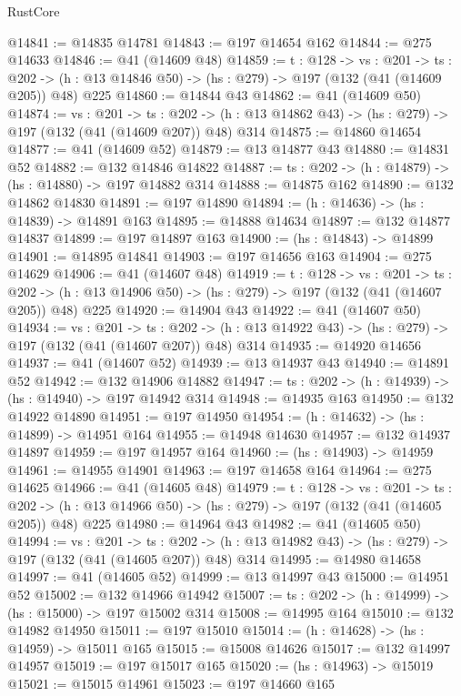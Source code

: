\begin{lexlean}{RustCore}
\begin{coremodule}
@14841 := @14835 @14781
@14843 := @197 @14654 @162
@14844 := @275 @14633
@14846 := @41 (@14609 @48)
@14859 := {t : @128} ->
  {vs : @201} ->
  {ts : @202} -> (h : @13 @14846 @50) -> (hs : @279) -> @197 (@132 (@41 (@14609 @205)) @48) @225
@14860 := @14844 @43
@14862 := @41 (@14609 @50)
@14874 := {vs : @201} ->
  {ts : @202} -> (h : @13 @14862 @43) -> (hs : @279) -> @197 (@132 (@41 (@14609 @207)) @48) @314
@14875 := @14860 @14654
@14877 := @41 (@14609 @52)
@14879 := @13 @14877 @43
@14880 := @14831 @52
@14882 := @132 @14846 @14822
@14887 := {ts : @202} -> (h : @14879) -> (hs : @14880) -> @197 @14882 @314
@14888 := @14875 @162
@14890 := @132 @14862 @14830
@14891 := @197 @14890
@14894 := (h : @14636) -> (hs : @14839) -> @14891 @163
@14895 := @14888 @14634
@14897 := @132 @14877 @14837
@14899 := @197 @14897 @163
@14900 := (hs : @14843) -> @14899
@14901 := @14895 @14841
@14903 := @197 @14656 @163
@14904 := @275 @14629
@14906 := @41 (@14607 @48)
@14919 := {t : @128} ->
  {vs : @201} ->
  {ts : @202} -> (h : @13 @14906 @50) -> (hs : @279) -> @197 (@132 (@41 (@14607 @205)) @48) @225
@14920 := @14904 @43
@14922 := @41 (@14607 @50)
@14934 := {vs : @201} ->
  {ts : @202} -> (h : @13 @14922 @43) -> (hs : @279) -> @197 (@132 (@41 (@14607 @207)) @48) @314
@14935 := @14920 @14656
@14937 := @41 (@14607 @52)
@14939 := @13 @14937 @43
@14940 := @14891 @52
@14942 := @132 @14906 @14882
@14947 := {ts : @202} -> (h : @14939) -> (hs : @14940) -> @197 @14942 @314
@14948 := @14935 @163
@14950 := @132 @14922 @14890
@14951 := @197 @14950
@14954 := (h : @14632) -> (hs : @14899) -> @14951 @164
@14955 := @14948 @14630
@14957 := @132 @14937 @14897
@14959 := @197 @14957 @164
@14960 := (hs : @14903) -> @14959
@14961 := @14955 @14901
@14963 := @197 @14658 @164
@14964 := @275 @14625
@14966 := @41 (@14605 @48)
@14979 := {t : @128} ->
  {vs : @201} ->
  {ts : @202} -> (h : @13 @14966 @50) -> (hs : @279) -> @197 (@132 (@41 (@14605 @205)) @48) @225
@14980 := @14964 @43
@14982 := @41 (@14605 @50)
@14994 := {vs : @201} ->
  {ts : @202} -> (h : @13 @14982 @43) -> (hs : @279) -> @197 (@132 (@41 (@14605 @207)) @48) @314
@14995 := @14980 @14658
@14997 := @41 (@14605 @52)
@14999 := @13 @14997 @43
@15000 := @14951 @52
@15002 := @132 @14966 @14942
@15007 := {ts : @202} -> (h : @14999) -> (hs : @15000) -> @197 @15002 @314
@15008 := @14995 @164
@15010 := @132 @14982 @14950
@15011 := @197 @15010
@15014 := (h : @14628) -> (hs : @14959) -> @15011 @165
@15015 := @15008 @14626
@15017 := @132 @14997 @14957
@15019 := @197 @15017 @165
@15020 := (hs : @14963) -> @15019
@15021 := @15015 @14961
@15023 := @197 @14660 @165

\end{coremodule}
\end{lexlean}
